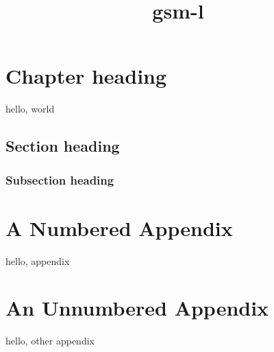 \documentclass{gsm-l}
\title{gsm-l}
\begin{document}
\maketitle

\tableofcontents

\chapter{Chapter heading}

hello, world

\section{Section heading}

\subsection{Subsection heading}

\appendix

\chapter{A Numbered Appendix}

hello, appendix

\chapter*{An Unnumbered Appendix}

hello, other appendix
\end{document}
